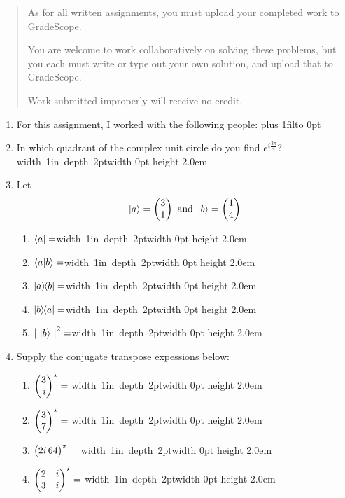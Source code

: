 \documentclass[12pt]{article}
\newcommand{\Blank}{\mbox{\hskip 4pt\vrule width 1in depth 2pt}\vrule width 0pt height 2.0em}
\def\DefaultSpace{1in}
\newcommand{\LeaveSpace}[1][\DefaultSpace]{%
\vskip #1 plus 1fil\relax\hbox to 0pt{\hss} %
}
\begin{document}

\begin{quote}
    As for all written assignments, you must upload your completed work to GradeScope.

    You are welcome to work collaboratively on solving these problems, but you each must write or type out your own solution, and upload that to GradeScope.

    Work submitted improperly will receive no credit.
\end{quote}

\begin{enumerate}[font=\bfseries]
    \item For this assignment, I worked with the following people:
    \LeaveSpace{}
    \item {} In which quadrant of the complex unit circle do you find $e^{i\frac{3\pi}{4}}$?\Blank{}
    \item {} Let
    \[ \ket{a} = \SQB{3}{1} \mbox{ and } \ket{b} = \SQB{1}{4} \]
    \begin{enumerate}[label=\theenumi.\arabic*]
        \item $\bra{a}=$\Blank{}
        \item $\braket{a|b}=$\Blank{}
        \item $\ket{a}\kern-3pt\bra{b}=$\Blank{}
        \item $\ket{b}\kern-3pt\bra{a}=$\Blank{}
        \item ${{|\,\ket{b}\,|}}^{2}=$\Blank{}
    \end{enumerate}


    \item {} Supply the conjugate transpose expessions below:
    \begin{enumerate}[label=\theenumi.\arabic*]
       \item $\Conj{\SQB{3}{i}}=$ \Blank{}
       \item $\Conj{\SQB{3}{7}}=$  \Blank{}
       \item $\Conj{\CQB{2i}{64}}=$ \Blank{}
       \item $\Conj{\SQBG{\relax}{2}{i}{3}{i}}=$ \Blank{}
    \end{enumerate}


\end{enumerate}
\end{document}
